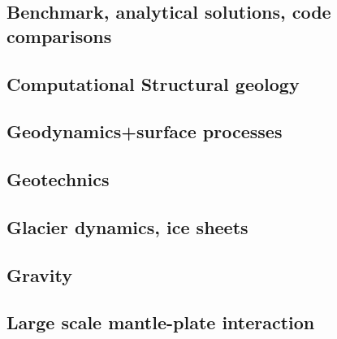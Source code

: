 
\subsection{Benchmark, analytical solutions, code comparisons}

\cite{yusa84}
\cite{zhon96}
\cite{zhmt08}


\subsection*{Computational Structural geology}

\cite{acgf00}

\subsection*{Geodynamics+surface processes}

\cite{zemk01}
\cite{avbu96}
\cite{alle08}

\subsection*{Geotechnics}

\cite{zhll03}

\subsection*{Glacier dynamics, ice sheets}

\cite{asbl06}
\cite{zhjg11}
\cite{issg15}

\subsection*{Gravity}

\cite{zhou08}

\subsection*{Large scale mantle-plate interaction}

